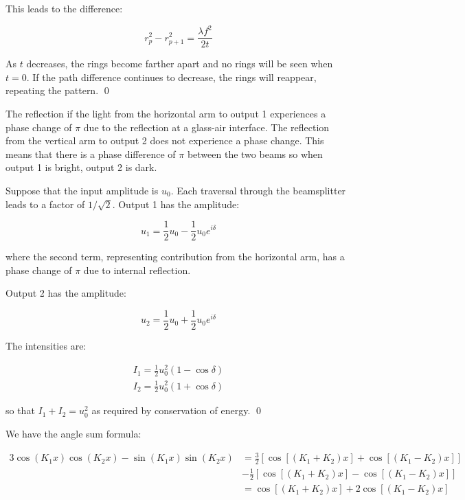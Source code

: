 \documentclass[12pt]{article}
\begin{document}
This leads to the difference:

\begin{equation}
    r_{p}^{2} - r_{p+1}^{2} = \frac{\lambda f^{2}}{2t}
\end{equation}

As $t$ decreases, the rings become farther apart and no rings will be seen when $t = 0$. If the path difference continues to decrease, the rings will reappear, repeating the pattern.
\qed



The reflection if the light from the horizontal arm to output 1 experiences a phase change of $\pi$ due to the reflection at a glass-air interface. The reflection from the vertical arm to output 2 does not experience a phase change. This means that there is a phase difference of $\pi$ between the two beams so when output 1 is bright, output 2 is dark.

Suppose that the input amplitude is $u_{0}$. Each traversal through the beamsplitter leads to a factor of $1/\sqrt{2}$. Output 1 has the amplitude:

\begin{equation}
    u_{1} = \frac{1}{2} u_{0} - \frac{1}{2} u_{0} e^{i \delta}
\end{equation}

where the second term, representing contribution from the horizontal arm, has a phase change of $\pi$ due to internal reflection.

Output 2 has the amplitude:

\begin{equation}
    u_{2} = \frac{1}{2} u_{0} + \frac{1}{2} u_{0} e^{i \delta}
\end{equation}

The intensities are:

\begin{equation}
    \begin{split}
        I_{1} = \frac{1}{2} u_{0}^{2} (1 - \cos{\delta}) \\
        I_{2} = \frac{1}{2} u_{0}^{2} (1 + \cos{\delta})
    \end{split}
\end{equation}

so that $I_{1} + I_{2} = u_{0}^{2}$ as required by conservation of energy.
\qed


We have the angle sum formula:

\begin{equation}
    \begin{split}
        3\cos{(K_{1} x)} \cos{(K_{2} x)} - \sin{(K_{1} x)} \sin{(K_{2} x)} &= \frac{3}{2} \left[ \cos{[(K_{1} + K_{2})x]} + \cos{[(K_{1} - K_{2})x]} \right] \\
        &- \frac{1}{2} \left[ \cos{[(K_{1} + K_{2})x]} - \cos{[(K_{1} - K_{2})x]} \right] \\
        &= \cos{[(K_{1} + K_{2})x]} + 2 \cos{[(K_{1} - K_{2})x]}
    \end{split}
\end{equation}
\end{document}
